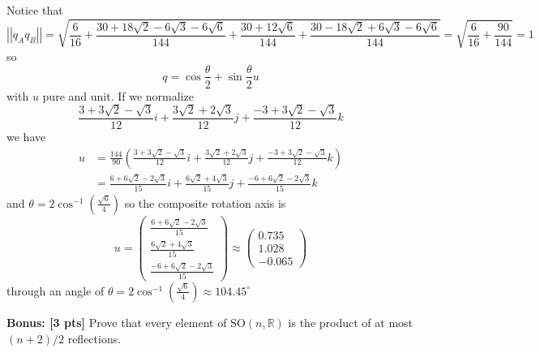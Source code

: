 \documentclass[12pt]{article}
\newcommand{\R}{\mathbb{R}}
\newcommand{\SO}{\text{SO}}
\newcommand{\norm}[1]{\left\vert \left\vert #1 \right\vert \right\vert}
\begin{document}
        Notice that 
        \[\norm{q_A  q_B} = \sqrt{\frac{6}{16} + \frac{30 + 18\sqrt 2 - 6\sqrt 3 - 6\sqrt 6}{144} + \frac{30 + 12\sqrt 6}{144} + \frac{30 - 18\sqrt 2 + 6\sqrt 3 - 6\sqrt 6}{144}} = \sqrt{\frac{6}{16} + \frac{90}{144}} = 1\]
        so 
        \[q = \cos \frac{\theta}{2} + \sin \frac{\theta}{2}u\]
        with $u$ pure and unit. If we normalize  
        \[\frac{3 + 3\sqrt 2 - \sqrt 3}{12}i + \frac{3\sqrt 2 + 2\sqrt 3}{12}j + \frac{-3 + 3\sqrt 2 - \sqrt 3}{12}k\]
        we have 
        \begin{align*}
            u &= \frac{144}{90}\left(\frac{3 + 3\sqrt 2 - \sqrt 3}{12}i + \frac{3\sqrt 2 + 2\sqrt 3}{12}j + \frac{-3 + 3\sqrt 2 - \sqrt 3}{12}k\right)\\ 
            &= \frac{6 + 6\sqrt 2 - 2\sqrt 3}{15}i + \frac{6\sqrt 2 + 4\sqrt 3}{15}j + \frac{-6 + 6\sqrt 2 - 2\sqrt 3}{15}k
        \end{align*}
        and $\theta = 2\cos^{-1}\left(\frac{\sqrt 6}{4}\right)$ so the composite rotation axis is 
        \[u = \begin{pmatrix}
            \frac{6 + 6\sqrt 2 - 2\sqrt 3}{15}\\ 
            \frac{6\sqrt 2 + 4\sqrt 3}{15}\\ 
            \frac{-6 + 6\sqrt 2 - 2\sqrt 3}{15}
        \end{pmatrix} \approx \begin{pmatrix}
            0.735\\ 
            1.028\\
            -0.065
        \end{pmatrix}\]
        through an angle of $\theta = 2\cos^{-1}\left(\frac{\sqrt 6}{4}\right) \approx 104.45^{\circ}$
    \color{black}


\pagebreak
\textbf{Bonus: [3 pts]}  Prove that every element of $\SO(n,\R)$ is the product of at most $(n+2)/2$ reflections.  
\end{document}
